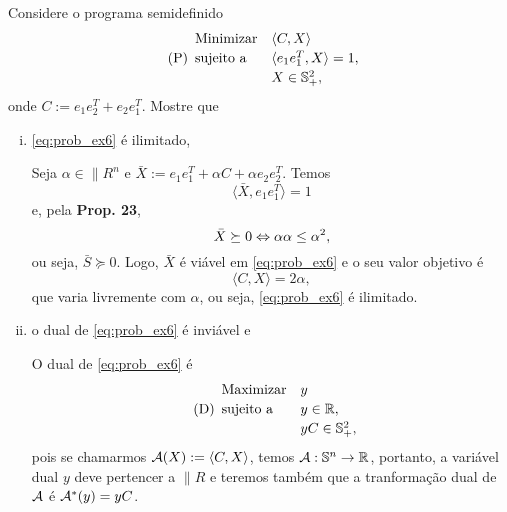 \begin{homeworkProblem}
Considere o programa semidefinido
\begin{equation} \tag{P} \label{eq:prob_ex6}
    \begin{array}[!h]{lll}
        \text{Minimizar} & \langle C, X \rangle                                                      & \\[2pt]
        \text{sujeito a} & \langle e_1e_1^T, X \rangle = 1,                                          & \\[2pt]
                         & X \in \|{S}_+^2,                                                          & \\
    \end{array}
\end{equation}
onde $C := e_1e_2^T + e_2e_1^T$. Mostre que

\begin{enumerate}[(i)]

\item \eqref{eq:prob_ex6} é ilimitado,
\begin{homeworkProblemAnswer}
Seja $\alpha \in \|{R}^n$ e $\bar{X} := e_1e_1^T + \alpha C + \alpha e_2e_2^T$. Temos
$$\langle \bar{X}, e_1e_1^T \rangle = 1$$
e, pela \textbf{Prop. 23}, 
$$\bar{X} \succeq 0 \sse \alpha \alpha \leq \alpha^2,$$
ou seja, $\bar{S} \succeq 0$. Logo, $\bar{X}$ é viável em \eqref{eq:prob_ex6} e o seu valor objetivo é
$$ \langle C, X \rangle = 2 \alpha, $$
que varia livremente com $\alpha$, ou seja, \eqref{eq:prob_ex6} é ilimitado.
\end{homeworkProblemAnswer}

\item o dual de \eqref{eq:prob_ex6} é inviável e
\begin{homeworkProblemAnswer}
O dual de \eqref{eq:prob_ex6} é
\begin{equation} \tag{D} \label{eq:dual_ex6}
    \begin{array}[!h]{lll}
        \text{Maximizar} & y                                                                         & \\[2pt]
        \text{sujeito a} & y \in \|{R},                                                              & \\[2pt]
                         & yC \in \|{S}_+^2,                                                              & \\
    \end{array}
\end{equation}
pois se chamarmos $\"{A}(X) := \langle C, X \rangle$, temos $\"{A} : \|{S}^n \rightarrow \|{R}$, portanto, a variável dual $y$ deve pertencer a $\|{R}$ e teremos também que a tranformação dual de $\"{A}$ é $\"{A}^*(y) = yC$.  


\end{homeworkProblemAnswer}
\end{enumerate}
\end{homeworkProblem}
